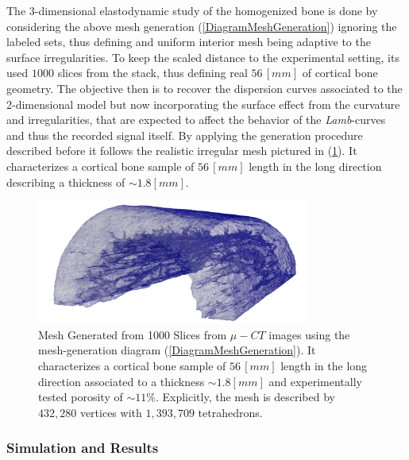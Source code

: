 The 3-dimensional elastodynamic study of the homogenized bone is done by considering the above mesh generation (\ref{DiagramMeshGeneration}) ignoring the labeled sets, thus defining and uniform interior mesh being adaptive to the surface irregularities.
To keep the scaled distance to the experimental setting, its used $1000$ slices from the stack, thus defining real $56 \, [mm]$ of cortical bone geometry.
The objective then is to recover the dispersion curves associated to the 2-dimensional model but now incorporating the surface effect from the curvature and irregularities, that are expected to affect the behavior of the \textit{Lamb}-curves and thus the recorded signal itself.
By applying the generation procedure described before it follows the realistic irregular mesh pictured in (\ref{HomBoneMeshFile}). It characterizes a cortical bone sample of $56 \, [mm]$ length in the long direction describing a thickness of $\sim 1.8 [mm]$. 

\begin{figure}[!h]
	\centering
	\includegraphics[width=0.8\textwidth]{images/ImgExt/CorticalBoneS1000OPT20-View.png}
	\caption{Mesh Generated from 1000 Slices from $\mu-CT$ images using the mesh-generation diagram (\ref{DiagramMeshGeneration}). It characterizes a cortical bone sample of $56 \, [mm]$ length in the long direction associated to a thickness $\sim 1.8 [mm]$ and experimentally tested porosity of $\sim 11 \%$. Explicitly, the mesh is described by $432,280$ vertices with $1,393,709$ tetrahedrons.}
	\label{HomBoneMeshFile}
\end{figure} 

 \subsubsection{Simulation and Results}

